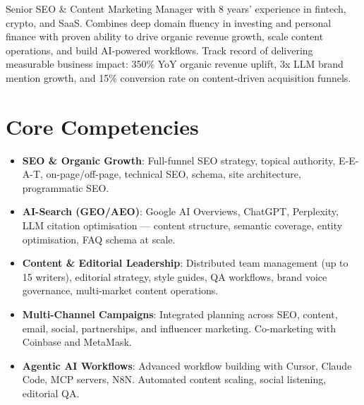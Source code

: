 \documentclass[11pt,a4paper,sans]{moderncv}
\begin{document}
\makecvtitle

\vspace{6pt}
\small{Senior SEO \& Content Marketing Manager with 8 years' experience in fintech, crypto, and SaaS. Combines deep domain fluency in investing and personal finance with proven ability to drive organic revenue growth, scale content operations, and build AI-powered workflows. Track record of delivering measurable business impact: 350\% YoY organic revenue uplift, 3x LLM brand mention growth, and 15\% conversion rate on content-driven acquisition funnels.}


\section{Core Competencies}
\vspace{1pt}
\begin{itemize}

\item \textbf{SEO \& Organic Growth}: Full-funnel SEO strategy, topical authority, E-E-A-T, on-page/off-page, technical SEO, schema, site architecture, programmatic SEO.

\item \textbf{AI-Search (GEO/AEO)}: Google AI Overviews, ChatGPT, Perplexity, LLM citation optimisation — content structure, semantic coverage, entity optimisation, FAQ schema at scale.

\item \textbf{Content \& Editorial Leadership}: Distributed team management (up to 15 writers), editorial strategy, style guides, QA workflows, brand voice governance, multi-market content operations.

\item \textbf{Multi-Channel Campaigns}: Integrated planning across SEO, content, email, social, partnerships, and influencer marketing. Co-marketing with Coinbase and MetaMask.

\item \textbf{Agentic AI Workflows}: Advanced workflow building with Cursor, Claude Code, MCP servers, N8N. Automated content scaling, social listening, editorial QA.

\end{itemize}

\end{document}
